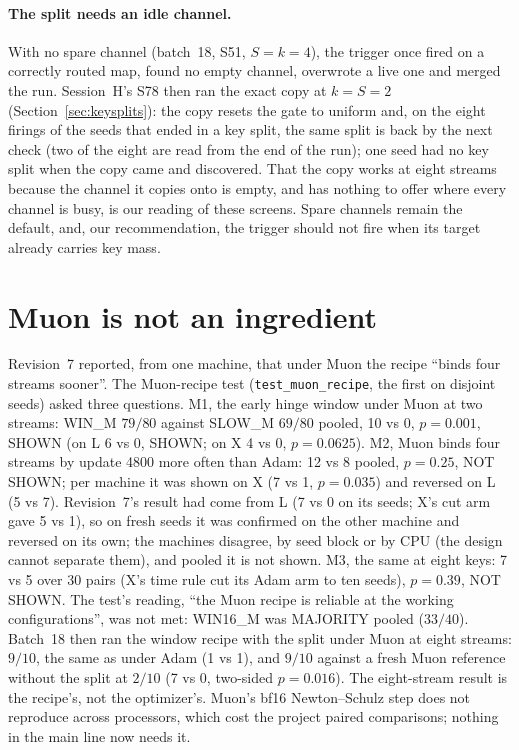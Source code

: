 \documentclass[11pt]{article}
\newcommand{\arm}[1]{\textsf{#1}}
\begin{document}
\paragraph{The split needs an idle channel.} With no spare channel (batch~18, S51, $S = k = 4$), the trigger once fired on a correctly routed map, found no empty channel, overwrote a live one and merged the run. Session~H's S78 then ran the exact copy at $k = S = 2$ (Section~\ref{sec:keysplits}): the copy resets the gate to uniform and, on the eight firings of the seeds that ended in a key split, the same split is back by the next check (two of the eight are read from the end of the run); one seed had no key split when the copy came and discovered. That the copy works at eight streams because the channel it copies onto is empty, and has nothing to offer where every channel is busy, is our reading of these screens. Spare channels remain the default, and, our recommendation, the trigger should not fire when its target already carries key mass.

\section{Muon is not an ingredient}
\label{sec:muon}

Revision~7 reported, from one machine, that under Muon the recipe ``binds four streams sooner''. The Muon-recipe test (\texttt{test\_muon\_recipe}, the first on disjoint seeds) asked three questions. M1, the early hinge window under Muon at two streams: \arm{WIN\_M} $79/80$ against \arm{SLOW\_M} $69/80$ pooled, 10 vs 0, $p = 0.001$, SHOWN (on L 6 vs 0, SHOWN; on X 4 vs 0, $p = 0.0625$). M2, Muon binds four streams by update 4800 more often than Adam: 12 vs 8 pooled, $p = 0.25$, NOT SHOWN; per machine it was shown on X (7 vs 1, $p = 0.035$) and reversed on L (5 vs 7). Revision~7's result had come from L (7 vs 0 on its seeds; X's cut arm gave 5 vs 1), so on fresh seeds it was confirmed on the other machine and reversed on its own; the machines disagree, by seed block or by CPU (the design cannot separate them), and pooled it is not shown. M3, the same at eight keys: 7 vs 5 over 30 pairs (X's time rule cut its Adam arm to ten seeds), $p = 0.39$, NOT SHOWN. The test's reading, ``the Muon recipe is reliable at the working configurations'', was not met: \arm{WIN16\_M} was MAJORITY pooled ($33/40$). Batch~18 then ran the window recipe with the split under Muon at eight streams: $9/10$, the same as under Adam (1 vs 1), and $9/10$ against a fresh Muon reference without the split at $2/10$ (7 vs 0, two-sided $p = 0.016$). The eight-stream result is the recipe's, not the optimizer's. Muon's bf16 Newton--Schulz step does not reproduce across processors, which cost the project paired comparisons; nothing in the main line now needs it.
\end{document}
